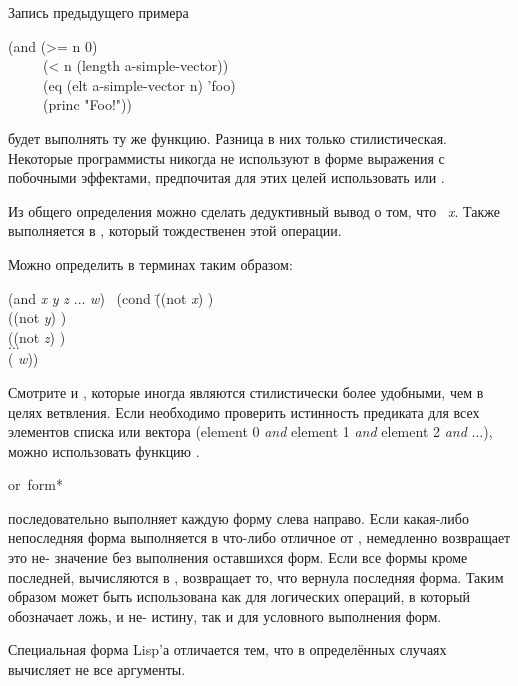 \begin{defun}[Функция]
\begin{defmac}
Запись предыдущего примера
\begin{lisp}
(and (>= n 0) \\
~~~~~(< n (length a-simple-vector)) \\
~~~~~(eq (elt a-simple-vector n) 'foo) \\
~~~~~(princ "Foo!"))
\end{lisp}
будет выполнять ту же функцию. Разница в них только стилистическая. Некоторые
программисты никогда не используют в форме  выражения с побочными
эффектами, предпочитая для этих целей использовать  или . 

Из общего определения можно сделать дедуктивный вывод о том, что 
 \EQ\ \emph{x}. Также  выполняется в {\true},
который тождественен этой операции.

Можно определить  в терминах  таким образом:
\begin{lisp}
(and \emph{x} \emph{y} \emph{z} ... \emph{w}) \EQ\ (cond \=((not \emph{x}) {\false}) \\
\>((not \emph{y}) {\false}) \\
\>((not \emph{z}) {\false}) \\
\>$\ldots$ \\
\>({\true} \emph{w}))
\end{lisp}

Смотрите  и , которые иногда являются стилистически более
удобными, чем  в целях ветвления.
Если необходимо проверить истинность предиката для всех элементов списка или
вектора (element 0 \emph{and} element 1 \emph{and}
element 2 \emph{and} $\ldots$), можно использовать функцию .
\end{defmac}

\begin{defmac}
or {\,form}*

 последовательно выполняет каждую
форму слева направо. Если какая-либо непоследняя форма выполняется в что-либо
отличное от {\false},  немедленно возвращает это не-{\false} значение
без выполнения оставшихся форм. Если все формы кроме последней, вычисляются в
{\false},  возвращает то, что вернула последняя форма.
Таким образом  может быть использована как для логических операций, 
в который {\false} обозначает ложь, и не-{\false} истину,
так и для условного выполнения форм.

Специальная форма Lisp'а  отличается тем, что в определённых случаях
вычисляет не все аргументы.


\end{defmac}
\end{defun}
